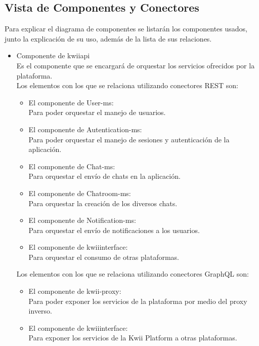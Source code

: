 \subsection{Vista de Componentes y Conectores}
\label{sub:cyc}
Para explicar el diagrama de componentes se listarán los componentes usados, junto la explicación de su uso, además de la lista de sus relaciones.
\begin{itemize}
    \item Componente de kwii\textunderscore api\\
    Es el componente que se encargará de orquestar los servicios ofrecidos por la plataforma.\\
    Los elementos con los que se relaciona utilizando conectores REST son:
    \begin{itemize}
        \item El componente de User-ms:\\
        Para poder orquestar el manejo de usuarios.
        \item El componente de Autentication-ms:\\
        Para poder orquestar el manejo de sesiones y autenticación de la aplicación.
        \item El componente de Chat-ms:\\
        Para orquestar el envío de chats en la aplicación.
        \item El componente de Chatroom-ms:\\
        Para orquestar la creación de los diversos chats.
        \item El componente de Notification-ms:\\
        Para orquestar el envío de notificaciones a los usuarios.
        \item El componente de kwii\textunderscore interface:\\
        Para orquestar el consumo de otras plataformas.
    \end{itemize}
    Los elementos con los que se relaciona utilizando conectores GraphQL son:
    \begin{itemize}
        \item El componente de kwii-proxy:\\
        Para poder exponer los servicios de la plataforma por medio del proxy inverso.
        \item El componente de kwii\textunderscore interface:\\
        Para exponer los servicios de la Kwii Platform a otras plataformas.

\end{itemize}
\end{itemize}
